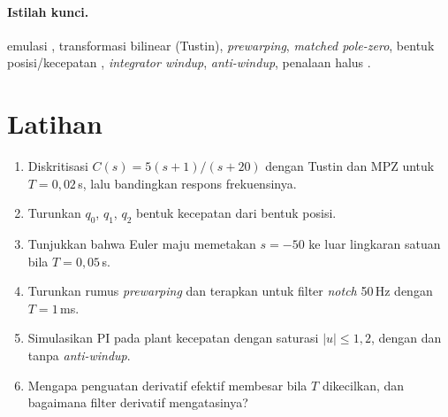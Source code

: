 \paragraph{Istilah kunci.} emulasi , transformasi bilinear (Tustin), \textit{prewarping}, \textit{matched pole-zero}, bentuk posisi/kecepatan , \textit{integrator windup}, \textit{anti-windup}, penalaan halus .

\section*{Latihan}
\begin{enumerate}
	\item Diskritisasi $C(s) = 5(s+1)/(s+20)$ dengan Tustin dan MPZ untuk $T = 0{,}02$\,s, lalu bandingkan respons frekuensinya.
	\item Turunkan $q_0$, $q_1$, $q_2$ bentuk kecepatan dari bentuk posisi.
	\item Tunjukkan bahwa Euler maju memetakan $s = -50$ ke luar lingkaran satuan bila $T = 0{,}05$\,s.
	\item Turunkan rumus \textit{prewarping} dan terapkan untuk filter \textit{notch} 50\,Hz dengan $T = 1$\,ms.
	\item Simulasikan PI pada plant kecepatan dengan saturasi $|u| \le 1{,}2$, dengan dan tanpa \textit{anti-windup}.
	\item Mengapa penguatan derivatif efektif membesar bila $T$ dikecilkan, dan bagaimana filter derivatif mengatasinya?
\end{enumerate}
